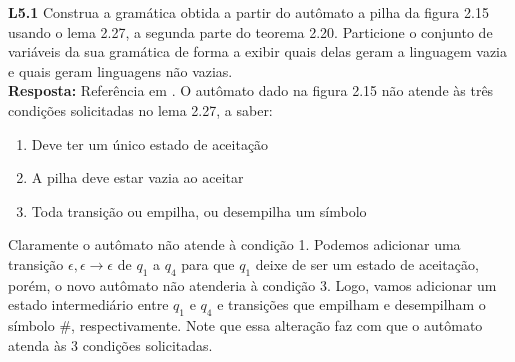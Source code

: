 
\noindent \textbf{L5.1} Construa a gramática obtida a partir do autômato a pilha da figura 2.15 usando o lema 2.27, a segunda parte do teorema 2.20. Particione o conjunto de variáveis da sua gramática de forma a exibir quais delas geram a linguagem vazia e quais geram linguagens não vazias.\\[3pt]
\textbf{Resposta: } Referência em \cite{portland}. O autômato dado na figura 2.15 não atende às três condições solicitadas no lema 2.27, a saber:

\begin{enumerate}[label={\textbf{\arabic*.}}]
    \item Deve ter um  único estado de aceitação
    \item A pilha deve estar vazia ao aceitar
    \item Toda transição ou empilha, ou desempilha um símbolo
\end{enumerate}

Claramente o autômato não atende à condição 1. Podemos adicionar uma transição $\epsilon, \epsilon \rightarrow \epsilon$ de $q_1$ a $q_4$ para que $q_1$ deixe de ser um estado de aceitação, porém, o novo autômato não atenderia à condição 3. Logo, vamos adicionar um estado intermediário entre $q_1$ e $q_4$ e transições que empilham e desempilham o símbolo $\texttt{\#}$, respectivamente. Note que essa alteração faz com que o  autômato atenda às 3 condições solicitadas.

